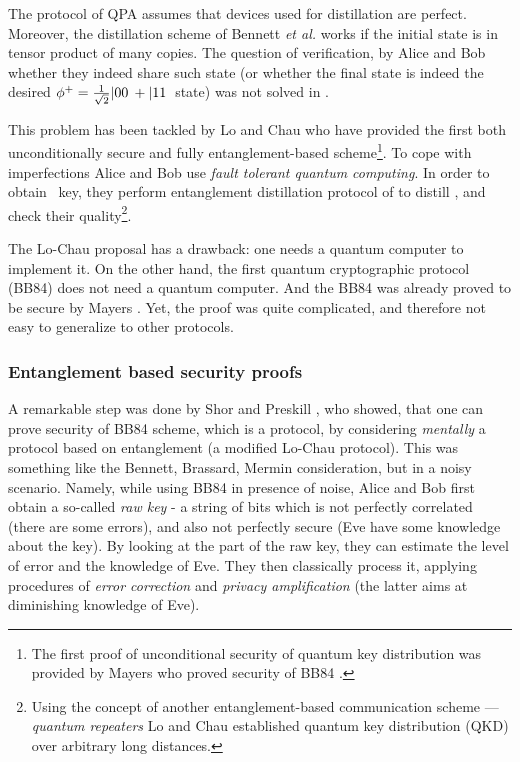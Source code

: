 \documentclass[twocolumn,aps,rmp]{revtex4}
\begin{document}
The protocol of QPA assumes that devices used for distillation are
perfect. Moreover, the distillation scheme of Bennett \emph{et al.}
works if the initial state is in tensor product of many copies. The
question of verification, by Alice and Bob whether they indeed share
such state (or whether the final state is indeed the desired
$\phi^+={1\over \sqrt2}|00\>+|11\>$
state) was not solved in \cite{QPA}.

This problem has been tackled by Lo and Chau \cite{Lo-Chau} who have
provided the first both unconditionally secure and fully
entanglement-based scheme\footnote{The first proof of unconditional security of quantum key distribution was provided by Mayers who proved security of BB84 \cite{Mayers84proof}.}.
To cope with imperfections Alice and Bob use {\it fault tolerant quantum
  computing}. In order to obtain \secure\ key, they perform
entanglement distillation protocol of \cite{BDSW1996} to distill
\singlets, and check their quality\footnote{Using the concept of
  another entanglement-based communication scheme --- {\it quantum
    repeaters} \cite{repeatersPRL,repeaters} Lo and Chau established
  quantum key distribution (QKD) over arbitrary long distances.}.

The Lo-Chau proposal has a drawback: one needs a quantum
computer to implement it. On the other hand, the first quantum
cryptographic protocol (BB84) does not need a quantum computer. And
the BB84 was already proved to be secure by Mayers
\cite{Mayers84proof}. Yet, the proof was quite complicated, and
therefore not easy to generalize to other protocols.

\subsubsection{Entanglement based security proofs}

A remarkable step was done by Shor and Preskill \cite{ShorPreskill},
who showed, that one can prove security of BB84 scheme, which is a
\pmp protocol, by considering {\it mentally} a protocol based on
entanglement (a modified Lo-Chau protocol). This was something like
the Bennett, Brassard, Mermin consideration, but in a noisy
scenario. Namely, while using BB84 in presence of noise, Alice and Bob
first obtain a so-called {\it raw key} - a string of bits which is not
perfectly correlated (there are some errors),
and also not perfectly secure (Eve have some knowledge about the key). By looking at
the part of the raw key,  they can estimate
the level of error and the knowledge of Eve.
They then classically process
it, applying procedures of {\it error correction} and {\it privacy
amplification} (the latter aims at diminishing knowledge of Eve).
\end{document}
